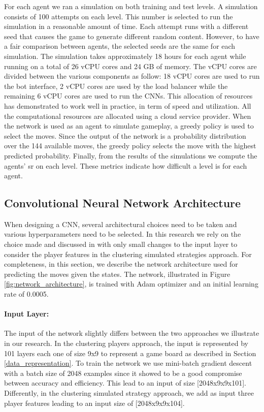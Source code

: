 For each agent we ran a simulation on both training and test levels. A simulation consists of 100 attempts on each level. This number is selected to run the simulation in a reasonable amount of time. Each attempt runs with a different seed that causes the game to generate different random content. However, to have a fair comparison between agents, the selected seeds are the same for each simulation. The simulation takes approximately 18 hours for each agent while running on a total of 26 \acf{vCPU} cores and 24 GB of memory. The \acs{vCPU} cores are divided between the various components as follow: 18 \acs{vCPU} cores are used to run the bot interface, 2 \acs{vCPU} cores are used by the load balancer while the remaining 6 \acs{vCPU} cores are used to run the \acsp{CNN}. This allocation of resources has demonstrated to work well in practice, in term of speed and utilization. All the computational resources are allocated using a cloud service provider.
When the network is used as an agent to simulate gameplay, a greedy policy is used to select the moves. Since the output of the network is a probability distribution over the 144 available moves, the greedy policy selects the move with the highest predicted probability. 
Finally, from the results of the simulations we compute the agents' \acs{sr} on each level. These metrics indicate how difficult a level is for each agent.


\subsection{Convolutional Neural Network Architecture}
When designing a \ac{CNN}, several architectural choices need to be taken and various hyperparameters need to be selected. In this research we rely on the choice made and discussed in \cite{eisen_simulating_2017} with only small changes to the input layer to consider the player features in the clustering simulated strategies approach. For completeness, in this section, we describe the network architecture used for predicting the moves given the states. The network, illustrated in Figure \ref{fig:network_architecture}, is trained with Adam optimizer \cite{kingma_adam:_2014} and an initial learning rate of 0.0005.

\paragraph{Input Layer:}
The input of the network slightly differs between the two approaches we illustrate in our research. In the clustering players approach, the input is represented by 101 layers each one of size 9x9 to represent a game board as described in Section \ref{data_representation}. To train the network we use mini-batch gradient descent with a batch size of 2048 examples since it showed to be a good compromise between accuracy and efficiency. This lead to an input of size [2048x9x9x101]. Differently, in the clustering simulated strategy approach, we add as input three player features leading to an input size of [2048x9x9x104].

